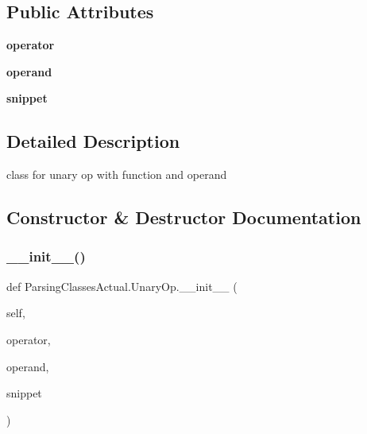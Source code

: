 \subsection*{Public Attributes}
\begin{DoxyCompactItemize}
\item 
\mbox{\label{class_parsing_classes_actual_1_1_unary_op_afb0d7cdde99cb150d27d101f00fbf275}} 
{\bfseries operator}
\item 
\mbox{\label{class_parsing_classes_actual_1_1_unary_op_a34fbc9a5ae586ae2640a00777b23a090}} 
{\bfseries operand}
\item 
\mbox{\label{class_parsing_classes_actual_1_1_unary_op_ab8b505d37c98c26e98376ed18b5999d2}} 
{\bfseries snippet}
\end{DoxyCompactItemize}


\subsection{Detailed Description}
class for unary op with function and operand 

\subsection{Constructor \& Destructor Documentation}
\mbox{\label{class_parsing_classes_actual_1_1_unary_op_ae822716a1ac45674aa119773fb9eb0aa}} 
\subsubsection{\texorpdfstring{\+\_\+\+\_\+init\+\_\+\+\_\+()}{\_\_init\_\_()}}
{\footnotesize\ttfamily def Parsing\+Classes\+Actual.\+Unary\+Op.\+\_\+\+\_\+init\+\_\+\+\_\+ (\begin{DoxyParamCaption}\item[{}]{self,  }\item[{}]{operator,  }\item[{}]{operand,  }\item[{}]{snippet }\end{DoxyParamCaption})}



